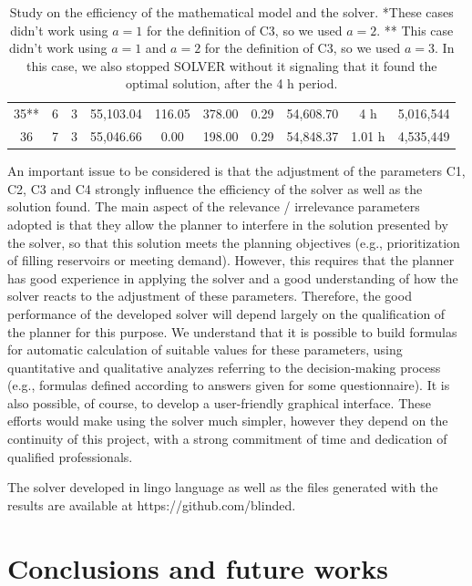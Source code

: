 \documentclass{singlecol}
\theoremstyle{TH}{
\newtheorem{lemma}{Lemma}
\newtheorem{theorem}[lemma]{Theorem}
\newtheorem{corrolary}[lemma]{Corrolary}
\newtheorem{conjecture}[lemma]{Conjecture}
\newtheorem{proposition}[lemma]{Proposition}
\newtheorem{claim}[lemma]{Claim}
\newtheorem{stheorem}[lemma]{Wrong Theorem}
\newtheorem{algorithm}{Algorithm}
}
\theoremstyle{THrm}{
\newtheorem{definition}{Definition}[section]
\newtheorem{question}{Question}[section]
\newtheorem{remark}{Remark}
\newtheorem{scheme}{Scheme}
}
\theoremstyle{THhit}{
\newtheorem{case}{Case}[section]
}
\begin{document}
\begin{table}[h!]
\begin{center}
\begin{small}
\begin{tabular}{ c c c c c c c c c c }
	 35**  & 6 & 3  & 55,103.04  &  116.05  & 378.00 &  0.29   &   54,608.70  & 4 h & 5,016,544 \\
	 36  & 7 & 3  & 55,046.66  &  0.00  & 198.00 &  0.29   &   54,848.37  & 1.01 h & 4,535,449 \\
	\end{tabular}
\caption{Study on the efficiency of the mathematical model and the solver. *These cases didn't work using $a=1$ for the definition of C3, so we used $a=2$. ** This case didn't work using $a=1$ and $a=2$ for the definition of C3, so we used $a=3$. In this case, we also stopped SOLVER without it signaling that it found the optimal solution, after the 4 h period.}
\label{tab:lingoEvaluation}
\end{small}
\end{center}
\end{table}

An important issue to be considered is that the adjustment of the parameters C1, C2, C3 and C4 strongly influence the efficiency of the solver as well as the solution found. The main aspect of the relevance / irrelevance parameters adopted is that they allow the planner to interfere in the solution presented by the solver, so that this solution meets the planning objectives (e.g., prioritization of filling reservoirs or meeting demand). However, this requires that the planner has good experience in applying the solver and a good understanding of how the solver reacts to the adjustment of these parameters. Therefore, the good performance of the developed solver will depend largely on the qualification of the planner for this purpose. We understand that it is possible to build formulas for automatic calculation of suitable values for these parameters, using quantitative and qualitative analyzes referring to the decision-making process (e.g., formulas defined according to answers given for some questionnaire). It is also possible, of course, to develop a user-friendly graphical interface. These efforts would make using the solver much simpler, however they depend on the continuity of this project, with a strong commitment of time and dedication of qualified professionals.

The solver developed in lingo language as well as the files generated with the results are available at https://github.com/blinded.

\section{Conclusions and future works}
\label{sec:conclusions}
\end{document}
